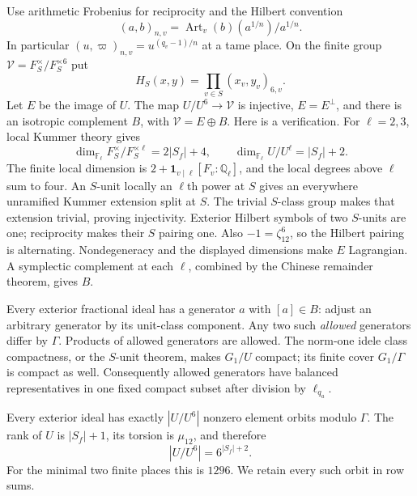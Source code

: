 \documentclass[11pt,a4paper]{article}
\numberwithin{equation}{section}
\theoremstyle{definition}
\theoremstyle{remark}
\newcommand{\Q}{\mathbb Q}
\newcommand{\ind}{\mathbf1}
\begin{document}
Use arithmetic Frobenius for reciprocity and the Hilbert convention
\[
 (a,b)_{n,v}=\operatorname{Art}_v(b)(a^{1/n})/a^{1/n}.
\]
In particular $(u,\varpi)_{n,v}=u^{(q_v-1)/n}$ at a tame place. On the finite group $\mathcal V=F_S^\times/F_S^{\times6}$ put
\[
 H_S(x,y)=\prod_{v\in S}(x_v,y_v)_{6,v}.
\]
Let $E$ be the image of $U$. The map $U/U^6\to\mathcal V$ is injective, $E=E^\perp$, and there is an isotropic complement $B$, with $\mathcal V=E\oplus B$. Here is a verification. For $\ell=2,3$, local Kummer theory gives
\[
 \dim_{\mathbb F_\ell}F_S^\times/F_S^{\times\ell}=2|S_f|+4,
 \qquad
 \dim_{\mathbb F_\ell}U/U^\ell=|S_f|+2.
\]
The finite local dimension is $2+\ind_{v\mid\ell}[F_v:\Q_\ell]$, and the local degrees above $\ell$ sum to four. An $S$-unit locally an $\ell$th power at $S$ gives an everywhere unramified Kummer extension split at $S$. The trivial $S$-class group makes that extension trivial, proving injectivity. Exterior Hilbert symbols of two $S$-units are one; reciprocity makes their $S$ pairing one. Also $-1=\zeta_{12}^6$, so the Hilbert pairing is alternating. Nondegeneracy and the displayed dimensions make $E$ Lagrangian. A symplectic complement at each $\ell$, combined by the Chinese remainder theorem, gives $B$.

Every exterior fractional ideal has a generator $a$ with $[a]\in B$: adjust an arbitrary generator by its unit-class component. Any two such \emph{allowed} generators differ by $\Gamma$. Products of allowed generators are allowed. The norm-one idele class compactness, or the $S$-unit theorem, makes $G_1/U$ compact; its finite cover $G_1/\Gamma$ is compact as well. Consequently allowed generators have balanced representatives in one fixed compact subset after division by $\ell_{q_a}$.

Every exterior ideal has exactly $|U/U^6|$ nonzero element orbits modulo $\Gamma$. The rank of $U$ is $|S_f|+1$, its torsion is $\mu_{12}$, and therefore
\begin{equation}\label{eq:unitcount}
 |U/U^6|=6^{|S_f|+2}.
\end{equation}
For the minimal two finite places this is $1296$. We retain every such orbit in row sums.
\end{document}
